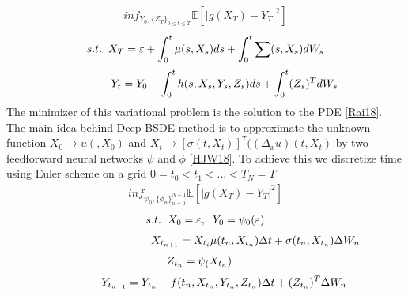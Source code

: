 \documentclass[letterpaper,10pt,english]{jupyterBook}
\begin{document}
\begin{equation*}
\begin{split} inf_{Y_0,\{Z_T\}_{0\leq t\leq T}} \mathbb{E}[|g(X_T) - Y_T|^2] \end{split}
\end{equation*}\begin{equation*}
\begin{split} s.t. \hspace{0.2cm}X_T = \varepsilon + \int_0^t \mu(s,X_s)ds + \int_0^t\sum(s,X_s)dW_s \end{split}
\end{equation*}\begin{equation*}
\begin{split}  \hspace{1.2cm}Y_t = Y_0 - \int_0^th(s,X_s,Y_s,Z_s)ds + \int_0^t(Z_s)^TdW_s\end{split}
\end{equation*}
\sphinxAtStartPar
The minimizer of this variational problem is the solution to the PDE {[}\hyperlink{cite.Discussion:id26}{Rai18}{]}. The main idea behind Deep BSDE method is to approximate the unknown function \(X_0 \rightarrow u(, X_0)\) and \(X_t \rightarrow [\sigma(t,X_t)]^T((\Delta_x u)(t,X_t)\) by two feedforward neural networks \(\psi\) and \(\phi\) {[}\hyperlink{cite.Discussion:id30}{HJW18}{]}. To achieve this we discretize time using Euler scheme on a grid \( 0 = t_0<t_1<...<T_N =T \)
\begin{equation*}
\begin{split} inf_{\psi_0,\{\phi_n\}^{N-1}_{n=0}} \mathbb{E}[|g(X_T) - Y_T|^2] \end{split}
\end{equation*}\begin{equation*}
\begin{split} s.t. \hspace{0.2cm} X_0 = \varepsilon, \hspace{0.2cm} Y_0 = \psi_0(\varepsilon)\end{split}
\end{equation*}\begin{equation*}
\begin{split} \hspace{3.2cm} X_{t_{n+1}} = X_{t_i} \mu(t_n,X_{t_n}) \Delta t + \sigma(t_n,X_{t_n}) \Delta W_n\end{split}
\end{equation*}\begin{equation*}
\begin{split} Z_{t_n} = \psi_(X_{t_n}) \hspace{0.4cm}\end{split}
\end{equation*}\begin{equation*}
\begin{split}  \hspace{1.2cm}Y_{t_{n+1}} = Y_{t_n} - f(t_n,X_{t_n},Y_{t_n},Z_{t_n})\Delta t  + (Z_{t_n})^T \Delta W_n\end{split}
\end{equation*}
\end{document}
